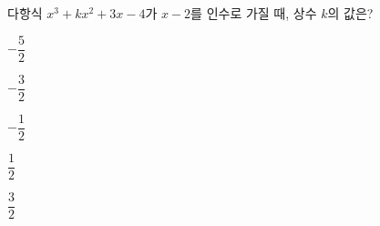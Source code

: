 다항식 $x^3+kx^2+3x-4$가 $x-2$를 인수로 가질 때, 상수 $k$의 값은?
\begin{choices32}{\rule[-3ex]{0pt}{8ex}$-\dfrac{5}{2}$}{\rule[-3ex]{0pt}{8ex}$-\dfrac{3}{2}$}{\rule[-3ex]{0pt}{8ex}$-\dfrac{1}{2}$}{\rule[-3ex]{0pt}{8ex}$\dfrac{1}{2}$}{\rule[-3ex]{0pt}{8ex}$\dfrac{3}{2}$}\end{choices32}
